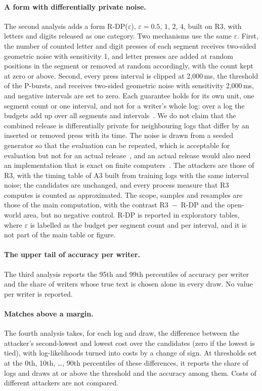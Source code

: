 \paragraph{A form with differentially private noise.}
The second analysis adds a form R-DP($\varepsilon$), $\varepsilon = 0.5$, $1$, $2$, $4$, built on R3, with letters and
digits released as one category. Two mechanisms use the same $\varepsilon$. First, the number of counted letter and
digit presses of each segment receives two-sided geometric noise with sensitivity 1, and letter presses are added at
random positions in the segment or removed at random accordingly, with the count kept at zero or above. Second, every
press interval is clipped at 2,000\,ms, the threshold of the P-bursts, and receives two-sided geometric noise with
sensitivity 2,000\,ms, and negative intervals are set to zero. Each guarantee holds for its own unit, one segment count
or one interval, and not for a writer's whole log: over a log the budgets add up over all segments and
intervals~\cite{kellaris2014event}. We do not claim that the combined release is differentially private for neighbouring
logs that differ by an inserted or removed press with its time. The noise is drawn from a seeded generator so that the
evaluation can be repeated, which is acceptable for evaluation but not for an actual release~\cite{holohan2023random},
and an actual release would also need an implementation that is exact on finite
computers~\cite{canonne2020discrete}. The attackers are those of R3, with the timing table of A3 built from training
logs with the same interval noise; the candidates are unchanged, and every process measure that R3 computes is counted as
approximated. The scope, samples and resamples are those of the main computation, with the contrast R3~$-$~R-DP and the
open-world area, but no negative control. R-DP is reported in exploratory tables, where $\varepsilon$ is labelled as the budget per segment count and per
interval, and it is not part of the main table or figure.

\paragraph{The upper tail of accuracy per writer.}
The third analysis reports the 95th and 99th percentiles of accuracy per writer and the share of writers whose true text
is chosen alone in every draw. No value per writer is reported.

\paragraph{Matches above a margin.}
The fourth analysis takes, for each log and draw, the difference between the attacker's second-lowest and lowest cost
over the candidates (zero if the lowest is tied), with log-likelihoods turned into costs by a change of sign. At
thresholds set at the 0th, 10th, \ldots, 90th percentiles of these differences, it reports the share of logs and draws
at or above the threshold and the accuracy among them. Costs of different attackers are not compared.

